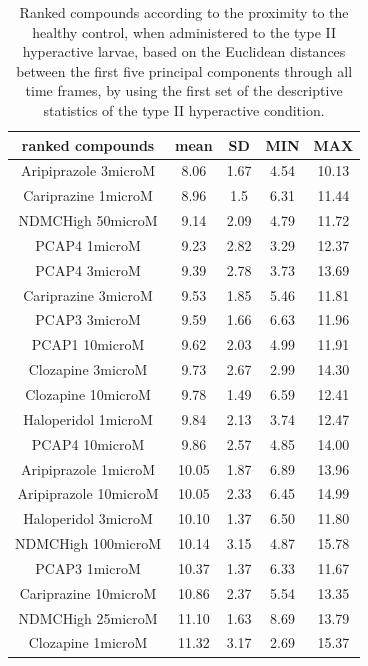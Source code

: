 \documentclass[a4paper,12pt]{article}
\begin{document}
\begin{table}[h!]\tiny
\centering
\caption{Ranked compounds according to the proximity to the healthy control, when administered to the type II hyperactive larvae, based on the Euclidean distances between the first five principal components through all time frames, by using the first set of the descriptive statistics of the type II hyperactive condition.}
\begin{tabular}{|c|c|c|c|c|}
\hline
ranked compounds             & mean & SD   & MIN  & MAX   \\ \hline
Aripiprazole 3microM  & 8.06  & 1.67 & 4.54  & 10.13 \\ \hline
Cariprazine 1microM   & 8.96  & 1.5  & 6.31  & 11.44 \\ \hline
NDMCHigh 50microM     & 9.14  & 2.09 & 4.79  & 11.72 \\ \hline
PCAP4 1microM       & 9.23  & 2.82 & 3.29  & 12.37 \\ \hline
PCAP4 3microM       & 9.39  & 2.78 & 3.73  & 13.69 \\ \hline
Cariprazine 3microM   & 9.53  & 1.85 & 5.46  & 11.81 \\ \hline
PCAP3 3microM       & 9.59  & 1.66 & 6.63  & 11.96 \\ \hline
PCAP1 10microM        & 9.62  & 2.03 & 4.99  & 11.91 \\ \hline
Clozapine 3microM     & 9.73  & 2.67 & 2.99  & 14.30  \\ \hline
Clozapine 10microM    & 9.78  & 1.49 & 6.59  & 12.41 \\ \hline
Haloperidol 1microM   & 9.84  & 2.13 & 3.74  & 12.47 \\ \hline
PCAP4 10microM      & 9.86  & 2.57 & 4.85  & 14.00    \\ \hline
Aripiprazole 1microM  & 10.05 & 1.87 & 6.89  & 13.96 \\ \hline
Aripiprazole 10microM & 10.05 & 2.33 & 6.45  & 14.99 \\ \hline
Haloperidol 3microM   & 10.10  & 1.37 & 6.50   & 11.80  \\ \hline
NDMCHigh 100microM    & 10.14 & 3.15 & 4.87  & 15.78 \\ \hline
PCAP3 1microM       & 10.37 & 1.37 & 6.33  & 11.67 \\ \hline
Cariprazine 10microM  & 10.86 & 2.37 & 5.54  & 13.35 \\ \hline
NDMCHigh 25microM     & 11.10  & 1.63 & 8.69  & 13.79 \\ \hline
Clozapine 1microM     & 11.32 & 3.17 & 2.69  & 15.37 \\ \hline

\end{tabular}
\end{table}
\end{document}
